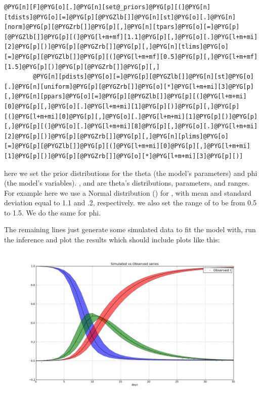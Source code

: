 \documentclass[a4paper,10pt,english]{manual}
\begin{document}
\begin{Verbatim}[commandchars=@\[\]]
@PYG[n][F]@PYG[o][.]@PYG[n][set@_priors]@PYG[p][(]@PYG[n][tdists]@PYG[o][=]@PYG[p][@PYGZlb[]]@PYG[n][st]@PYG[o][.]@PYG[n][norm]@PYG[p][@PYGZrb[]]@PYG[p][,]@PYG[n][tpars]@PYG[o][=]@PYG[p][@PYGZlb[]]@PYG[p][(]@PYG[l+m+mf][1.1]@PYG[p][,]@PYG[o][.]@PYG[l+m+mi][2]@PYG[p][)]@PYG[p][@PYGZrb[]]@PYG[p][,]@PYG[n][tlims]@PYG[o][=]@PYG[p][@PYGZlb[]]@PYG[p][(]@PYG[l+m+mf][0.5]@PYG[p][,]@PYG[l+m+mf][1.5]@PYG[p][)]@PYG[p][@PYGZrb[]]@PYG[p][,]
        @PYG[n][pdists]@PYG[o][=]@PYG[p][@PYGZlb[]]@PYG[n][st]@PYG[o][.]@PYG[n][uniform]@PYG[p][@PYGZrb[]]@PYG[o][*]@PYG[l+m+mi][3]@PYG[p][,]@PYG[n][ppars]@PYG[o][=]@PYG[p][@PYGZlb[]]@PYG[p][(]@PYG[l+m+mi][0]@PYG[p][,]@PYG[o][.]@PYG[l+m+mi][1]@PYG[p][)]@PYG[p][,]@PYG[p][(]@PYG[l+m+mi][0]@PYG[p][,]@PYG[o][.]@PYG[l+m+mi][1]@PYG[p][)]@PYG[p][,]@PYG[p][(]@PYG[o][.]@PYG[l+m+mi][8]@PYG[p][,]@PYG[o][.]@PYG[l+m+mi][2]@PYG[p][)]@PYG[p][@PYGZrb[]]@PYG[p][,]@PYG[n][plims]@PYG[o][=]@PYG[p][@PYGZlb[]]@PYG[p][(]@PYG[l+m+mi][0]@PYG[p][,]@PYG[l+m+mi][1]@PYG[p][)]@PYG[p][@PYGZrb[]]@PYG[o][*]@PYG[l+m+mi][3]@PYG[p][)]
\end{Verbatim}

here we set the prior distributions for the theta (the model's parameters) and phi (the model's variables). ,  and  are theta's distributions, parameters, and ranges. For example here we use a Normal distribution () for , with mean and standard deviation equal to 1.1 and .2, respectively. we also set the range of  to be from 0.5 to 1.5. We do the same for phi.

The remaining lines just generate some simulated data to fit the model with, run the inference and plot the results which should include plots like this:

\includegraphics[width=15cm]{fit_series.png}
\end{document}
